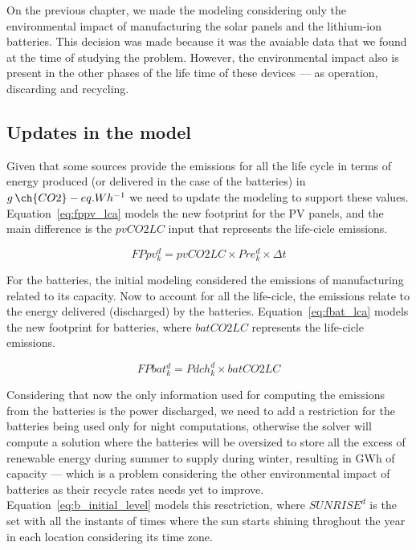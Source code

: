 On the previous chapter, we made the modeling considering only the environmental impact of manufacturing the solar panels and the lithium-ion batteries. This decision was made because it was the avaiable data that we found at the time of studying the problem. However, the environmental impact also is present in the other phases of the life time of these devices --- as operation, discarding and recycling.

\subsection{Updates in the model}

Given that some sources provide the emissions for all the life cycle in terms of energy produced (or delivered in the case of the batteries) in $g\,\ch{CO2}-eq.Wh^{-1}$ we need to update the modeling to support these values. Equation~\eqref{eq:fppv_lca} models the new footprint for the PV panels, and the main difference is the $pvCO2LC$ input that represents the life-cicle emissions.

\begin{equation} \label{eq:fppv_lca}
   FPpv^d_k =  pvCO2LC \times Pre_k^d \times \Delta t
\end{equation}


For the batteries, the initial modeling considered the emissions of manufacturing related to its capacity. Now to account for all the life-cicle, the emissions relate to the energy delivered (discharged) by the batteries. Equation~\eqref{eq:fbat_lca} models the new footprint for batteries, where $batCO2LC$ represents the life-cicle emissions. 

\begin{equation} \label{eq:fbat_lca}
   FPbat^d_k =  Pdch^d_k \times batCO2LC
 \end{equation}
 
Considering that now the only information used for computing the emissions from the batteries is the power discharged, we need to add a restriction for the batteries being used only for night computations, otherwise the solver will compute a solution where the batteries will be oversized to store all the excess of renewable energy during summer to supply during winter, resulting in GWh of capacity --- which is a problem considering the other environmental impact of batteries as their recycle rates needs yet to improve. Equation~\eqref{eq:b_initial_level}  models this resctriction, where $SUNRISE^d$ is the set with all the instants of times where the sun starts shining throghout the year in each location considering its time zone.

